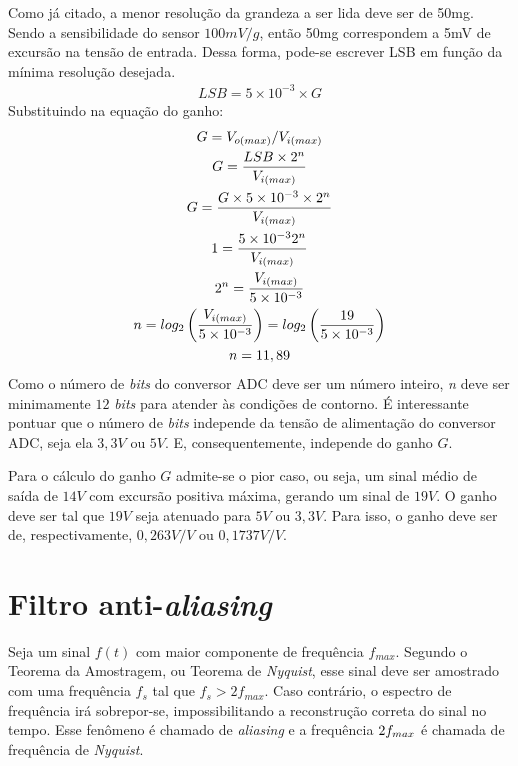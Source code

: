 \documentclass[11pt]{abntex2}
\begin{document}
			Como já citado, a menor resolução da grandeza a ser lida deve ser de
			50mg. Sendo a sensibilidade do sensor $100mV/g$, então 50mg
			correspondem a 5mV de excursão na tensão de entrada. Dessa forma,
			pode-se escrever LSB em função da mínima resolução desejada.
			\begin{gather*}
				LSB = 5\times 10^{-3}\times G
			\end{gather*}
			Substituindo na equação do ganho:
			\begin{gather*}
				G = V_{o(max)}/V_{i(max)}\\
				G = \frac{LSB\times 2^n}{V_{i(max)}}\\
				G = \frac{G\times 5\times 10^{-3}\times 2^n}{V_{i(max)}}\\
				1 = \frac{5\times 10^{-3}\*2^n}{V_{i(max)}}\\
				2^n = \frac{V_{i(max)}}{5\times 10^{-3}}\\
				n = log_2\left( \frac{V_{i(max)}}{5\times 10^{-3}} \right) = log_2\left( \frac{19}{5\times 10^{-3}}\right)\\
				n = 11,89
			\end{gather*}
			Como o número de \textit{bits} do conversor ADC deve ser um número inteiro, \textit{n}
			deve ser minimamente $12$ \textit{bits} para atender às condições de contorno. É
			interessante pontuar que o número de \textit{bits} independe da tensão de
			alimentação do conversor ADC, seja ela $3,3V$ ou $5V$. E, consequentemente,
			independe do ganho $G$.
			
			Para o cálculo do ganho $G$ admite-se o pior caso, ou seja, um sinal médio
			de saída de $14V$ com excursão positiva máxima, gerando um sinal de $19V$. O
			ganho deve ser tal que $19V$ seja atenuado para $5V$ ou $3,3V$. Para isso, o
			ganho deve ser de, respectivamente, $0,263V/V$ ou $0,1737V/V$.

		\section{Filtro anti-\textit{aliasing}}
			Seja um sinal $f(t)$ com maior componente de frequência $f_{max}$. Segundo
			o Teorema da Amostragem, ou Teorema de \textit{Nyquist}, esse sinal deve ser
			amostrado com uma frequência $f_s$ tal que $f_s>2f_{max}$. Caso contrário, o
			espectro de frequência irá sobrepor-se, impossibilitando a
			reconstrução correta do sinal no tempo. Esse fenômeno é chamado de
			\textit{aliasing} e a frequência $2\*f_{max}$ é chamada de frequência de \textit{Nyquist}.
\end{document}
